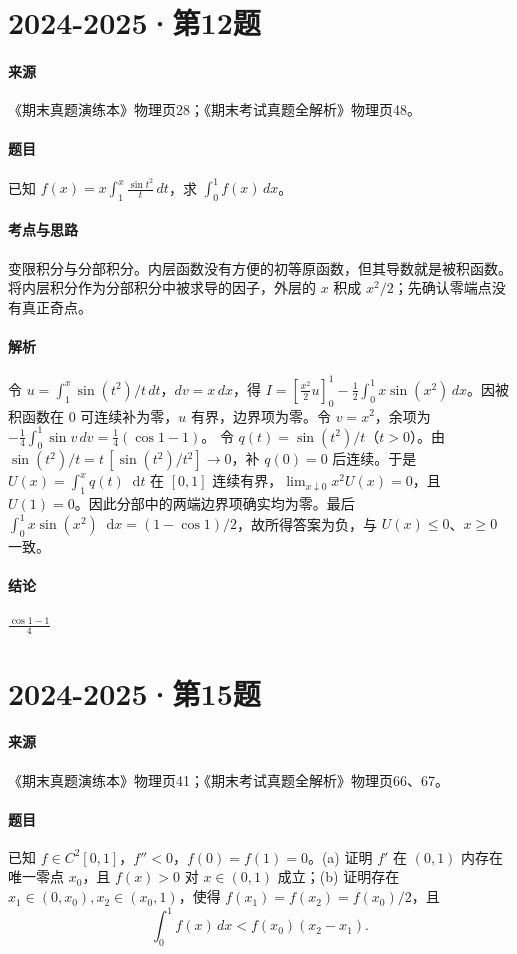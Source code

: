 \documentclass[UTF8,fontset=fandol,12pt,oneside,openany]{ctexrep}
\newcommand{\dd}{\mathop{}\!\mathrm d}
\theoremstyle{definition}
\begin{document}
\par\addvspace{18pt}\noindent\begin{minipage}{\linewidth}
\section{2024-2025·第12题}
\label{exam:11:q2}
\paragraph{来源} 《期末真题演练本》物理页28；《期末考试真题全解析》物理页48。
\paragraph{题目}
已知 $f(x)=x\int_1^x\frac{\sin t^2}{t}\,dt$，求 $\int_0^1 f(x)\,dx$。
\end{minipage}\par
\paragraph{考点与思路}
变限积分与分部积分。内层函数没有方便的初等原函数，但其导数就是被积函数。将内层积分作为分部积分中被求导的因子，外层的 $x$ 积成 $x^2/2$；先确认零端点没有真正奇点。
\paragraph{解析}
令 $u=\int_1^x\sin(t^2)/t\,dt$，$dv=x\,dx$，得 $I=[\frac{x^2}2u]_0^1-\frac12\int_0^1x\sin(x^2)\,dx$。因被积函数在 $0$ 可连续补为零，$u$ 有界，边界项为零。令 $v=x^2$，余项为 $-\frac14\int_0^1\sin v\,dv=\frac14(\cos1-1)$。
令 $q(t)=\sin(t^2)/t$（$t>0$）。由 $\sin(t^2)/t=t\,[\sin(t^2)/t^2]\to0$，补 $q(0)=0$ 后连续。于是 $U(x)=\int_1^xq(t)\dd t$ 在 $[0,1]$ 连续有界，$\lim_{x\downarrow0}x^2U(x)=0$，且 $U(1)=0$。因此分部中的两端边界项确实均为零。最后 $\int_0^1x\sin(x^2)\dd x=(1-\cos1)/2$，故所得答案为负，与 $U(x)\le0$、$x\ge0$ 一致。
\paragraph{结论}
$\frac{\cos1-1}4$

\par\addvspace{18pt}\noindent\begin{minipage}{\linewidth}
\section{2024-2025·第15题}
\label{exam:11:q3}
\paragraph{来源} 《期末真题演练本》物理页41；《期末考试真题全解析》物理页66、67。
\paragraph{题目}
已知 $f\in C^2[0,1]$，$f''<0$，$f(0)=f(1)=0$。(a) 证明 $f'$ 在 $(0,1)$ 内存在唯一零点 $x_0$，且 $f(x)>0$ 对 $x\in(0,1)$ 成立；(b) 证明存在 $x_1\in(0,x_0),x_2\in(x_0,1)$，使得 $f(x_1)=f(x_2)=f(x_0)/2$，且
\[\int_0^1f(x)\,dx<f(x_0)(x_2-x_1).\]
\end{minipage}\par
\end{document}
